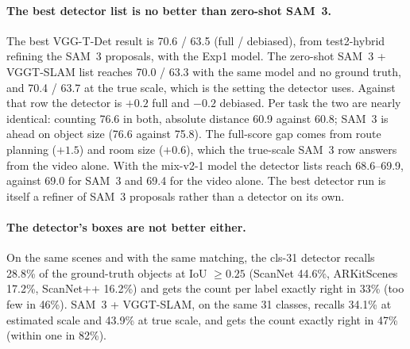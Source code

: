 \paragraph{The best detector list is no better than zero-shot SAM~3.}
The best VGG-T-Det result is 70.6 / 63.5 (full / debiased), from test2-hybrid refining the SAM~3 proposals, with the
Exp1 model. The zero-shot SAM~3 + VGGT-SLAM list reaches 70.0 / 63.3 with the same model and no ground truth, and
70.4 / 63.7 at the true scale, which is the setting the detector uses. Against that row the detector is $+0.2$ full
and $-0.2$ debiased. Per task the two are nearly identical: counting 76.6 in both, absolute distance 60.9 against 60.8;
SAM~3 is ahead on object size (76.6 against 75.8). The full-score gap comes from route planning ($+1.5$) and room
size ($+0.6$), which the true-scale SAM~3 row answers from the video alone. With the mix-v2-1 model the detector lists
reach 68.6--69.9, against 69.0 for SAM~3 and 69.4 for the video alone. The best detector run is itself a refiner of
SAM~3 proposals rather than a detector on its own.

\paragraph{The detector's boxes are not better either.}
On the same scenes and with the same matching, the cls-31 detector recalls 28.8\% of the ground-truth objects at
IoU $\geq 0.25$ (ScanNet 44.6\%, ARKitScenes 17.2\%, ScanNet++ 16.2\%) and gets the count per label exactly right in 33\%
(too few in 46\%). SAM~3 + VGGT-SLAM, on the same 31 classes, recalls 34.1\% at estimated scale and 43.9\% at true scale,
and gets the count exactly right in 47\% (within one in 82\%).

